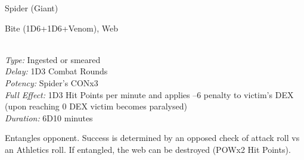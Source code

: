 \begin{samepage}
\begin{monsterbox}{Spider (Giant)}
	\basics[%
        hitpoints  = 22, 
	majorwound = 11,
	damagemodifier = +1D6,
	powerpoints = 11,
	movementrate = {15m on land, 23m in web},
	armor = Chitin (4 AP),
	]
	\rpghline%
	\stats[ %
		STR = 2D6+12 (19),
		CON = 3D6+6  (17),
		DEX = 2D6+9  (16),
		SIZ = 4D6+12 (26),
		INT = 8      (8),
		POW = 3D6    (11),
		CHA = 2      (2)
	]
	\rpghline%
	\begin{rpg-monsteraction}
		Bite (1D6+1D6+Venom), Web
	\end{rpg-monsteraction}
	\begin{rpg-monsteraction}\\
		\textit{Type:} Ingested or smeared\\
		\textit{Delay:} 1D3 Combat Rounds\\
		\textit{Potency:} Spider's CONx3\\
		\textit{Full Effect:} 1D3 Hit Points per minute and applies –6 penalty to victim’s DEX (upon reaching 0 DEX victim becomes paralysed)\\ 
		\textit{Duration:} 6D10 minutes
	\end{rpg-monsteraction}
	\begin{rpg-monsteraction}[Web]
		Entangles opponent. Success is determined by an opposed check of attack roll vs an Athletics roll. If entangled, the web can be destroyed (POWx2 Hit Points).
	\end{rpg-monsteraction}


\end{monsterbox}
\end{samepage}


